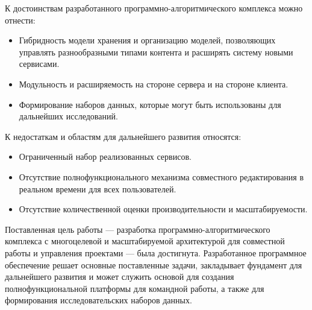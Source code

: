 К достоинствам разработанного программно-алгоритмического комплекса можно отнести:
\begin{itemize}
    \item Гибридность модели хранения и организацию моделей, позволяющих управлять разнообразными типами контента и расширять систему новыми сервисами.
    \item Модульность и расширяемость на стороне сервера и на стороне клиента.
    \item Формирование наборов данных, которые могут быть использованы для дальнейших исследований.
\end{itemize}

К недостаткам и областям для дальнейшего развития относятся:
\begin{itemize}
    \item Ограниченный набор реализованных сервисов.
    \item Отсутствие полнофункционального механизма совместного редактирования в реальном времени для всех пользователей.
    \item Отсутствие количественной оценки производительности и масштабируемости.
\end{itemize}

Поставленная цель работы --- разработка программно-алгоритмического комплекса с многоцелевой и масштабируемой архитектурой для совместной работы и управления проектами --- была достигнута. 
Разработанное программное обеспечение решает основные поставленные задачи, закладывает фундамент для дальнейшего развития и может служить основой для создания полнофункциональной платформы для командной работы, а также для формирования исследовательских наборов данных.
